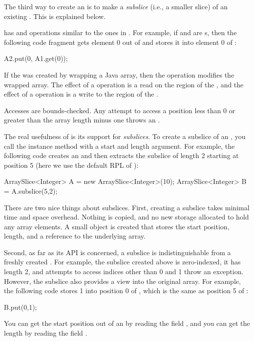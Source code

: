 The third way to create an  is to make a
\emph{subslice} (i.e., a smaller slice) of an existing
.  This is explained below.

  has  and
 operations similar to the ones in .
For example, if  and  are s, then the
following code fragment gets element 0 out of  and stores it
into element 0 of :
%
\begin{dpjlisting}
A2.put(0, A1.get(0));
\end{dpjlisting}
%
If the  was created by wrapping a Java array, then the
 operation modifies the wrapped array.  The effect of a
 operation is a read on the region of the , and
the effect of a  operation is a write to the region of the
.

Accesses are bounds-checked.  Any attempt to access a position less
than 0 or greater than the array length minus one throws an
.

 The real usefulness of  is its
support for \emph{subslices}.  To create a subslice of an
, you call the  instance method with a
start and length argument.  For example, the following code creates an
 and then extracts the subslice of length 2 starting
at position 5 (here we use the default RPL of ):
%
\begin{dpjlisting}
ArraySlice<Integer> A = new ArraySlice<Integer>(10);
ArraySlice<Integer> B = A.subslice(5,2);
\end{dpjlisting}

There are two nice things about subslices.  First, creating a subslice
takes minimal time and space overhead.  Nothing is copied, and no new
storage allocated to hold any array elements.  A small object is
created that stores the start position, length, and a reference to the
underlying array.

Second, as far as its API is concerned, a subslice is
indistinguishable from a freshly created .  For example,
the subslice created above is zero-indexed, it has length 2, and
attempts to access indices other than 0 and 1 throw an exception.
However, the subslice also provides a view into the original array.
For example, the following code stores 1 into position 0 of ,
which is the same as position 5 of :
%
\begin{dpjlisting}
B.put(0,1);
\end{dpjlisting}
%
You can get the start position out of an  by reading the
field , and you can get the length by reading the field
.

